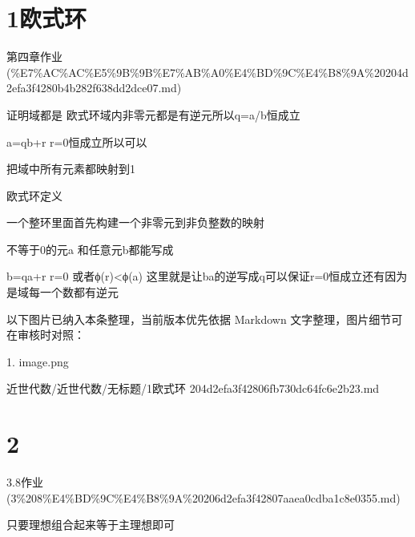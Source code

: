 \section*{1欧式环}

\begin{note}[来源上级主题]

第四章作业 (\%E7\%AC\%AC\%E5\%9B\%9B\%E7\%AB\%A0\%E4\%BD\%9C\%E4\%B8\%9A\%20204d2efa3f4280b4b282f638dd2dce07.md)

\end{note}

\begin{homework}

证明域都是 欧式环域内非零元都是有逆元所以q=a/b恒成立

a=qb+r r=0恒成立所以可以

把域中所有元素都映射到1

欧式环定义

一个整环里面首先构建一个非零元到非负整数的映射

不等于0的元a 和任意元b都能写成

b=qa+r r=0 或者ϕ(r)<ϕ(a) 这里就是让ba的逆写成q可以保证r=0恒成立还有因为是域每一个数都有逆元

\end{homework}

\begin{note}[关联图片]
以下图片已纳入本条整理，当前版本优先依据 Markdown 文字整理，图片细节可在审核时对照：

1. image.png\\

\end{note}

\begin{note}[来源路径]

近世代数/近世代数/无标题/1欧式环 204d2efa3f42806fb730dc64fc6e2b23.md

\end{note}

\section*{2}

\begin{note}[来源上级主题]

3.8作业 (3\%208\%E4\%BD\%9C\%E4\%B8\%9A\%20206d2efa3f42807aaea0cdba1c8e0355.md)

\end{note}

\begin{homework}

只要理想组合起来等于主理想即可

\end{homework}

